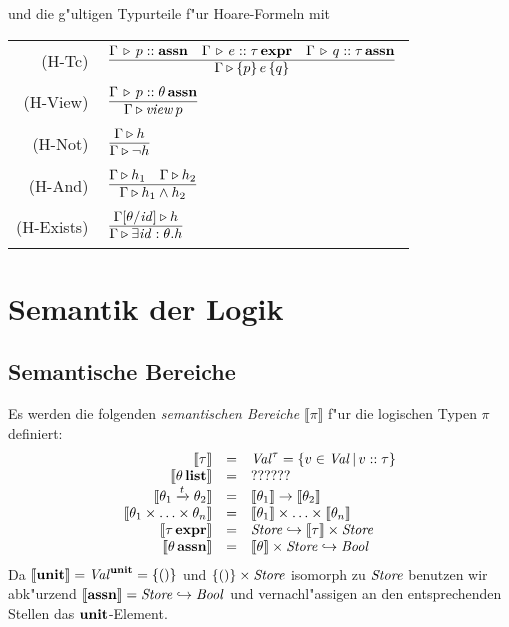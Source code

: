 \documentclass[12pt,a4paper,bigheadings]{scrartcl}
\newcommand{\semantic}[1]{\ensuremath{\llbracket#1\rrbracket}}
\newcommand{\assn}{\ensuremath{\mathbf{assn}}}
\newcommand{\atype}[1]{#1\,\assn}
\newcommand{\bexpr}{\ensuremath{\mathbf{expr}}}
\newcommand{\etype}[1]{#1\,\bexpr}
\newcommand{\tto}{\ensuremath{\xrightarrow{t}}}
\newcommand{\view}[1]{\ensuremath{\app{\name{view}}{#1}}}
\newcommand{\RN}[1]{\mbox{{\sc (#1)}}}
\begin{document}
und die g"ultigen Typurteile f"ur Hoare-Formeln mit \\[3mm]
\begin{tabular}{rl}
  \RN{H-Tc} & $\regel{\Tj{\Gamma}{p}{\assn} \quad \Tj{\Gamma}{e}{\etype{\tau}} \quad \Tj{\Gamma}{q}{\atype{\tau}}}
                     {\Tjh{\Gamma}{\triple{p}{e}{q}}}$ \\[1mm]
  \RN{H-View} & $\regel{\Tj{\Gamma}{p}{\atype{\theta}}}
                       {\Tjh{\Gamma}{\view{p}}}$ \\[1mm]
  \RN{H-Not} & $\regel{\Tjh{\Gamma}{h}}
                      {\Tjh{\Gamma}{\neg h}}$ \\[1mm]
  \RN{H-And} & $\regel{\Tjh{\Gamma}{h_1} \quad \Tjh{\Gamma}{h_2}}
                      {\Tjh{\Gamma}{h_1 \wedge h_2}}$ \\[1mm]
  \RN{H-Exists} & $\regel{\Tjh{\Gamma[\theta/\id]}{h}}
                         {\Tjh{\Gamma}{\exists \id:\theta.h}}$
\end{tabular}


\section{Semantik der Logik}

\subsection{Semantische Bereiche}

Es werden die folgenden {\em semantischen Bereiche} $\semantic{\pi}$ f"ur die logischen Typen $\pi$
definiert:
\[\begin{array}{rcl}
  \semantic{\tau} & = & \Val^\tau = \{v\in\Val\,|\,\tj{v}{\tau}\} \\
  \semantic{\ltype{\theta}} & = & ?????? \\
  \semantic{\theta_1 \tto \theta_2} & = & \semantic{\theta_1} \to \semantic{\theta_2} \\
  \semantic{\theta_1\times\ldots\times\theta_n}&=&\semantic{\theta_1}\times\ldots\times\semantic{\theta_n} \\
  \semantic{\etype{\tau}} & = & \Store \pto \semantic{\tau} \times \Store \\
  \semantic{\atype{\theta}} & = & \semantic{\theta} \times \Store \pto \Bool
\end{array}\]
Da $\semantic{\unit} = \Val^\unit = \{()\}$ und $\{()\}\times{\text{\it Store\/}}$ isomorph zu
${\text{\it Store\/}}$ benutzen wir abk"urzend $\semantic{\assn}=\Store\pto\Bool$ und vernachl"assigen
an den entsprechenden Stellen das $\textbf{unit}$-Element.
\end{document}
